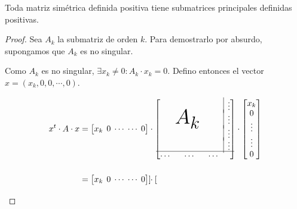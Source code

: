 \documentclass[]{article}
\begin{document}
\begin{prop}
	Toda matriz simétrica definida positiva tiene submatrices principales definidas positivas.
	\begin{proof}
		Sea $A_k$ la submatriz de orden $k$. Para demostrarlo por absurdo, supongamos que $A_k$ es no singular.

		Como $A_k$ es no singular, $\exists x_k\neq 0 : A_k\cdot x_k = 0$. Defino entonces el vector $x = (x_k,0,0,\cdots,0)$.

		\begin{align*}
			x^t\cdot A\cdot x &= \begin{bmatrix}
				 x_k & \hspace{-0.2cm}0 & \hspace{-0.2cm}\cdots \hspace{-0.2cm}& \cdots \hspace{-0.2cm}& 0
			\end{bmatrix}
			\cdot \begin{bmatrix}
				  & & & \multicolumn{1}{|c}{} & \hspace{-0.35cm}\vdots\\[-4pt]
				 &$\hspace{-0.2cm}\mbox{\Huge{$A_k$}}$ & & \multicolumn{1}{|c}{} & \hspace{-0.35cm}\vdots\\[-4pt]
				 & & & \multicolumn{1}{|c}{} & \hspace{-0.35cm}\vdots\\[-4pt]
				  & & & \multicolumn{1}{|c}{} & \hspace{-0.35cm}\vdots\\[-2pt]
				\cline{1-5}
				  \cdots & \cdots & \cdots & &\hspace{-0.35cm}
			\end{bmatrix} \cdot \begin{bmatrix}
				x_k \\ 0 \\ \vdots \\ \vdots \\ 0
			\end{bmatrix}\\
			&= \begin{bmatrix}
				 x_k & \hspace{-0.2cm}0 & \hspace{-0.2cm}\cdots \hspace{-0.2cm}& \cdots \hspace{-0.2cm}& 0
			\end{bmatrix} \cdot \begin{bmatrix}

\end{bmatrix}
\end{align*}
\end{proof}
\end{prop}
\end{document}

